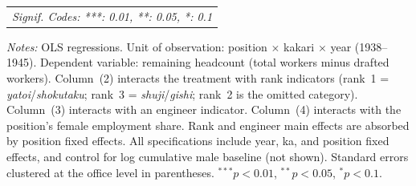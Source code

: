 \begin{table}[htbp]
\begin{threeparttable}
\begin{tabular}{lcccc}
   \multicolumn{5}{l}{\emph{Signif. Codes: ***: 0.01, **: 0.05, *: 0.1}}\\
\end{tabular}
\begin{tablenotes}[flushleft]
\footnotesize
\item \textit{Notes:} OLS regressions. Unit of observation: position $\times$ kakari $\times$ year (1938--1945). Dependent variable: remaining headcount (total workers minus drafted workers). Column~(2) interacts the treatment with rank indicators (rank~1 = \emph{yatoi}/\emph{shokutaku}; rank~3 = \emph{shuji}/\emph{gishi}; rank~2 is the omitted category). Column~(3) interacts with an engineer indicator. Column~(4) interacts with the position's female employment share. Rank and engineer main effects are absorbed by position fixed effects. All specifications include year, ka, and position fixed effects, and control for log cumulative male baseline (not shown). Standard errors clustered at the office level in parentheses. $^{***}p<0.01$, $^{**}p<0.05$, $^{*}p<0.1$.
\end{tablenotes}
\end{threeparttable}
\end{table}
